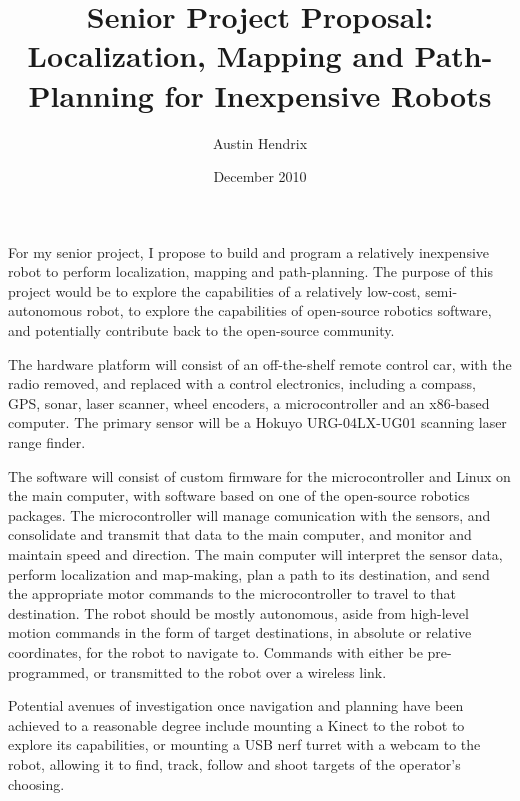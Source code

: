 \documentclass[a4paper,12pt]{article}
\begin{document}
\title{Senior Project Proposal: Localization, Mapping and Path-Planning for Inexpensive Robots}
\author{Austin Hendrix}
\date{December 2010}
\maketitle


For my senior project, I propose to build and program a relatively inexpensive robot to perform localization, mapping and path-planning. The purpose of this project would be to explore the capabilities of a relatively low-cost, semi-autonomous robot, to explore the capabilities of open-source robotics software, and potentially contribute back to the open-source community.

The hardware platform will consist of an off-the-shelf remote control car, with the radio removed, and replaced with a control electronics, including a compass, GPS, sonar, laser scanner, wheel encoders, a microcontroller and an x86-based computer. The primary sensor will be a Hokuyo URG-04LX-UG01 scanning laser range finder.

The software will consist of custom firmware for the microcontroller and Linux on the main computer, with software based on one of the open-source robotics packages. The microcontroller will manage comunication with the sensors, and consolidate and transmit that data to the main computer, and monitor and maintain speed and direction. The main computer will interpret the sensor data, perform localization and map-making, plan a path to its destination, and send the appropriate motor commands to the microcontroller to travel to that destination. The robot should be mostly autonomous, aside from high-level motion commands in the form of target destinations, in absolute or relative coordinates, for the robot to navigate to. Commands with either be pre-programmed, or transmitted to the robot over a wireless link.

Potential avenues of investigation once navigation and planning have been achieved to a reasonable degree include mounting a Kinect to the robot to explore its capabilities, or mounting a USB nerf turret with a webcam to the robot, allowing it to find, track, follow and shoot targets of the operator's choosing.
\end{document}
